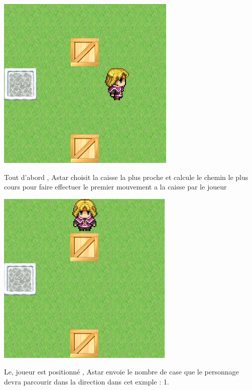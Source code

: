 \documentclass{article}
\begin{document}
		
		\begin{center}
		\includegraphics[scale=0.6]{../Screenshots/astar1.jpg}
		\end{center}
		Tout d'abord , Astar choisit la caisse la plus proche et calcule le chemin le plus cours pour faire effectuer le premier mouvement a la caisse par le joueur
		\begin{center}
		\vspace{1cm}
		\includegraphics[scale=0.8]{../Screenshots/astar2.jpg}

		Le, joueur est positionné , Astar envoie le nombre de case que le personnage devra parcourir dans la direction dans cet exmple : 1.
		\end{center}
\end{document}
